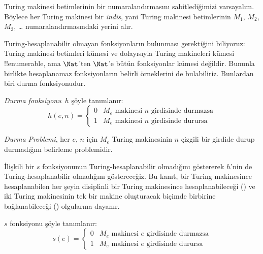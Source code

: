 


\begin{explain}
Turing makinesi betimlerinin bir numaralandırmasını sabitlediğimizi
varsayalım. Böylece her Turing makinesi bir \emph{indis}, yani Turing
makinesi betimlerinin $M_1$, $M_2$, $M_3$, \dots{} numaralandırmasındaki
yerini alır.

Turing-hesaplanabilir olmayan fonksiyonların bulunması gerektiğini biliyoruz:
Turing makinesi betimleri kümesi ve dolayısıyla Turing makineleri kümesi
!!{enumerable}, ama $\Nat$'ten $\Nat$'e bütün fonksiyonlar kümesi değildir.
Bununla birlikte hesaplanamaz fonksiyonların belirli örneklerini de
bulabiliriz. Bunlardan biri durma fonksiyonudur.
\end{explain}

\begin{defn}
 \emph{Durma fonksiyonu}~$h$ şöyle tanımlanır:
\[
h(e,n) =
\begin{cases}
  \text{0} & \text{$M_e$ makinesi $n$ girdisinde durmazsa} \\
  \text{1} & \text{$M_e$ makinesi $n$ girdisinde durursa}
\end{cases}
\]
\end{defn}

\begin{defn}
\emph{Durma Problemi}, her $e$, $n$ için $M_e$ Turing makinesinin $n$ çizgili
bir girdide durup durmadığını belirleme problemidir.
\end{defn}

\begin{explain}
İlişkili bir $s$ fonksiyonunun Turing-hesaplanabilir olmadığını göstererek
$h$'nin de Turing-hesaplanabilir olmadığını göstereceğiz. Bu kanıt, bir
Turing makinesince hesaplanabilen her şeyin disiplinli bir Turing makinesince
hesaplanabileceği () ve iki Turing makinesinin tek bir
makine oluşturacak biçimde birbirine bağlanabileceği
() olgularına dayanır.
\end{explain}

\begin{defn} $s$ fonksiyonu şöyle tanımlanır:
\[
s(e) =
\begin{cases}
  \text{0} & \text{$M_e$ makinesi $e$ girdisinde durmazsa} \\
  \text{1} & \text{$M_e$ makinesi $e$ girdisinde durursa}
\end{cases}
\]
\end{defn}


